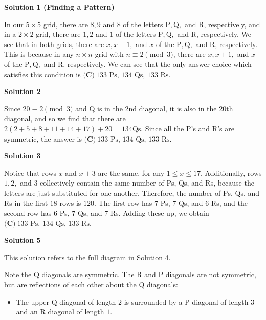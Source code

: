 \begin{enumerate}
\textbf{Solution 1 (Finding a Pattern)}

In our $5\times5$ grid, there are $8,9$ and $8$ of the letters $\text{P}, \text{Q},$ and $\text{R}$, respectively, and in a $2\times2$ grid, there are $1,2$ and $1$ of the letters $\text{P}, \text{Q},$ and $\text{R}$, respectively. We see that in both grids, there are $x, x+1,$ and $x$ of the $\text{P}, \text{Q},$ and $\text{R}$, respectively. This is because in any $n\times n$ grid with $n\equiv2\pmod3$, there are $x, x+1,$ and $x$ of the $\text{P}, \text{Q},$ and $\text{R}$, respectively. We can see that the only answer choice which satisfies this condition is $\boxed{\textbf{(C)}~133\text{ Ps, }134\text{ Qs, }133\text{ Rs}}.$




\textbf{Solution 2}

Since $20\equiv2\pmod3$ and $\text{Q}$ is in the 2nd diagonal, it is also in the 20th diagonal, and so we find that there are $2(2 + 5 + 8 + 11 + 14 + 17) + 20 = 134 \text{Qs}$. Since all the $\text{P}$'s and $\text{R}$'s are symmetric, the answer is $\boxed{\textbf{(C)}~133\text{ Ps, }134\text{ Qs, }133\text{ Rs}}.$




\textbf{Solution 3}

Notice that rows $x$ and $x+3$ are the same, for any $1 \leq x \leq 17.$ Additionally, rows $1, 2,$ and $3$ collectively contain the same number of $\text{P}$s, $\text{Q}$s, and $\text{R}$s, because the letters are just substituted for one another. Therefore, the number of $\text{P}$s, $\text{Q}$s, and $\text{R}$s in the first $18$ rows is $120$. The first row has $7$ $\text{P}$s, $7$ $\text{Q}$s, and $6$ $\text{R}$s, and the second row has $6$ $\text{P}$s, $7$ $\text{Q}$s, and $7$ $\text{R}$s. Adding these up, we obtain $\boxed{\textbf{(C)}~133\text{ Ps, }134\text{ Qs, }133\text{ Rs}}$.

 



\textbf{Solution 5}

This solution refers to the full diagram in Solution 4.

 Note the $\text{Q}$ diagonals are symmetric. The $\text{R}$ and $\text{P}$ diagonals are not symmetric, but are reflections of each other about the $\text{Q}$ diagonals: 

 
            \begin{itemize}
        \item The upper $\text{Q}$ diagonal of length $2$ is surrounded by a $\text{P}$ diagonal of length $3$ and an $\text{R}$ diagonal of length $1.$
            \end{itemize}
            

\end{enumerate}
